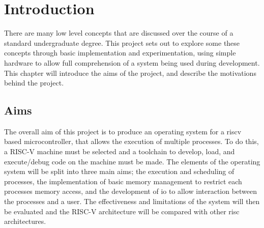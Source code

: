 \chapter{Introduction}
\label{cha:intro}
There are many low level concepts that are discussed over the course of a standard undergraduate degree. This project sets out to explore some these concepts through basic implementation and experimentation, using simple hardware to allow full comprehension of a system being used during development. This chapter will introduce the aims of the project, and describe the motivations behind the project.
\section{Aims}
The overall aim of this project is to produce an operating system for a \gls{riscv} based microcontroller, that allows the execution of multiple processes. To do this, a RISC-V machine must be selected and a toolchain to develop, load, and execute/debug code on the machine must be made. The elements of the operating system will be split into three main aims; the execution and scheduling of processes, the implementation of basic memory management to restrict each processes memory access, and the development of \ac{io} to allow interaction between the processes and a user. The effectiveness and limitations of the system will then be evaluated and the RISC-V architecture will be compared with other \ac{risc} architectures.

